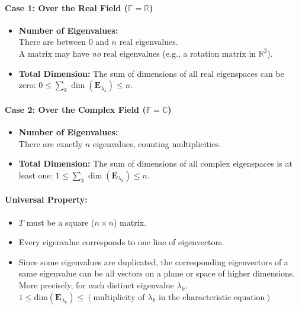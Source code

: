 \documentclass[11pt]{article}
\newcommand{\mysubvecsp}[1]{\bm{{#1}}}
\newcommand{\mymat}[1]{#1}
\begin{document}
    \paragraph{Case 1: Over the Real Field ($\mathbb{F} = \mathbb{R}$)}
    \begin{itemize}
        \item \textbf{Number of Eigenvalues:} \\
            There are between $0$ and $n$ real eigenvalues. \\
            A matrix may have \textit{no} real eigenvalues (e.g., a rotation matrix in $\mathbb{R}^2$).
        \item \textbf{Total Dimension:} The sum of dimensions of all real eigenspaces can be zero: $0 \le \sum_{k} \dim(\mysubvecsp{E}_{\lambda_k}) \le n$. 
    \end{itemize}

    \paragraph{Case 2: Over the Complex Field ($\mathbb{F} = \mathbb{C}$)}
    \begin{itemize}
        \item \textbf{Number of Eigenvalues:} \\
            There are exactly $n$ eigenvalues, counting multiplicities.
        \item \textbf{Total Dimension:} The sum of dimensions of all complex eigenspaces is at least one: $1 \le \sum_{k} \dim(\mysubvecsp{E}_{\lambda_k}) \le n$. 
    \end{itemize}

    \paragraph{Universal Property:}
    \begin{itemize}
        \item $\mymat{T}$ must be a square ($n \times n$) matrix.
        \item Every eigenvalue corresponds to one line of eigenvectors.
        \item Since some eigenvalues are duplicated, the corresponding eigenvectors of a same eigenvalue can be all vectors on a plane or space of higher dimensions.\\
            More precisely, for each distinct eigenvalue $\lambda_k$, $1 \le \text{dim}(\mysubvecsp{E}_{\lambda_k}) \le (\text{multiplicity of } \lambda_k \text{ in the characteristic equation})$
    \end{itemize}
    
\end{document}
